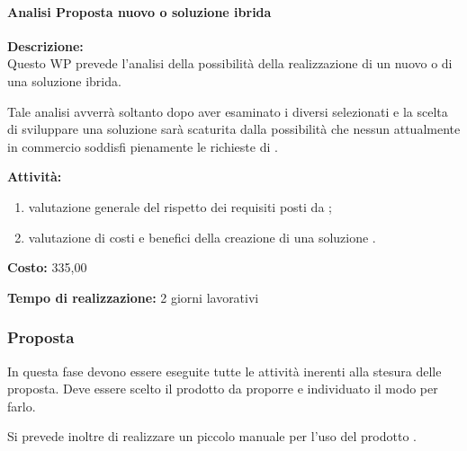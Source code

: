 \paragraph{\bfseries\sffamily{}Analisi Proposta nuovo \sw o soluzione ibrida }
\begin{description}
\item{\bfseries Descrizione:}\\
Questo WP prevede l'analisi della possibilità della realizzazione di un nuovo \sw o di una soluzione ibrida.

Tale analisi avverrà soltanto dopo aver esaminato i diversi \sw selezionati e la scelta di sviluppare una soluzione  sarà scaturita dalla possibilità che nessun \sw attualmente in commercio soddisfi pienamente le richieste di \customer.

\newpage

\item{\bfseries Attività:}
\begin{enumerate}
  \item valutazione generale del rispetto dei requisiti posti da \customer;
	\item valutazione di costi e benefici della creazione di una soluzione  .
\end{enumerate}
\item{\bfseries Costo:} \text{\euro} 335,00 
\item{\bfseries Tempo di realizzazione:} 2 giorni lavorativi
\end{description}

\subsubsection{Proposta}
In questa fase devono essere eseguite tutte le attività inerenti alla stesura delle proposta. Deve essere scelto il prodotto da proporre e individuato il modo per farlo.

Si prevede inoltre di realizzare un piccolo manuale per l'uso del prodotto \sw.


